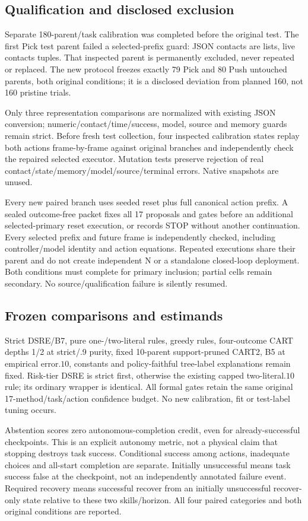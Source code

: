 \documentclass[conference]{IEEEtran}
\begin{document}
\subsection{Qualification and disclosed exclusion}
Separate 180-parent/task calibration was completed before the original test. The first Pick test parent failed a selected-prefix guard: JSON contacts are lists, live contacts tuples. That inspected parent is permanently excluded, never repeated or replaced. The new protocol freezes exactly 79 Pick and 80 Push untouched parents, both original conditions; it is a disclosed deviation from planned 160, not 160 pristine trials.

Only three representation comparisons are normalized with existing JSON conversion; numeric/contact/time/success, model, source and memory guards remain strict. Before fresh test collection, four inspected calibration states replay both actions frame-by-frame against original branches and independently check the repaired selected executor. Mutation tests preserve rejection of real contact/state/memory/model/source/terminal errors. Native snapshots are unused.

Every new paired branch uses seeded reset plus full canonical action prefix. A sealed outcome-free packet fixes all 17 proposals and gates before an additional selected-primary reset execution, or records STOP without another continuation. Every selected prefix and future frame is independently checked, including controller/model identity and action equations. Repeated executions share their parent and do not create independent N or a standalone closed-loop deployment. Both conditions must complete for primary inclusion; partial cells remain secondary. No source/qualification failure is silently resumed.

\subsection{Frozen comparisons and estimands}
Strict DSRE/B7, pure one-/two-literal rules, greedy rules, four-outcome CART depths 1/2 at strict/.9 purity, fixed 10-parent support-pruned CART2, B5 at empirical error$.10$, constants and policy-faithful tree-label explanations remain fixed. Risk-tier DSRE is strict first, otherwise the existing capped two-literal$.10$rule; its ordinary wrapper is identical. All formal gates retain the same original 17-method/task/action confidence budget. No new calibration, fit or test-label tuning occurs.

Abstention scores zero autonomous-completion credit, even for already-successful checkpoints. This is an explicit autonomy metric, not a physical claim that stopping destroys task success. Conditional success among actions, inadequate choices and all-start completion are separate. Initially unsuccessful means task success false at the checkpoint, not an independently annotated failure event. Required recovery means successful recover from an initially unsuccessful recover-only state relative to these two skills/horizon. All four paired categories and both original conditions are reported.
\end{document}
